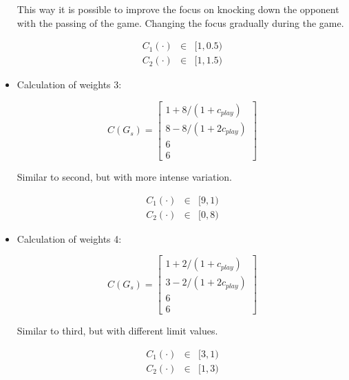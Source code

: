 \documentclass[a4paper]{article}
\begin{document}
\begin{itemize}
    \noindent This way it is possible to improve the focus on knocking down the opponent with the passing of the game. Changing the focus gradually during the game.
    
    \begin{eqnarray}
        C_1(\cdot) &\in& [1, 0.5) \\
        C_2(\cdot) &\in& [1, 1.5) 
    \end{eqnarray}
    
    \item Calculation of weights 3: 
    
    \begin{equation}
        C(G_s) =  \begin{bmatrix} 
        1+8/({1+c_{play}}) \\
        8-8/({1+2c_{play}}) \\ 
                                  6 \\ 6 \end{bmatrix}  \label{C3}
    \end{equation}
    
    \noindent Similar to second, but with more intense variation.
    
    \begin{eqnarray}
        C_1(\cdot) &\in& [9, 1) \\
        C_2(\cdot) &\in& [0, 8) 
    \end{eqnarray}
    
    \item Calculation of weights 4:
     
    \begin{equation}
        C(G_s) =  \begin{bmatrix} 
        1+2/({1+c_{play}}) \\
        3-2/({1+2c_{play}}) \\ 
                                  6 \\ 6 \end{bmatrix}  \label{C4}
    \end{equation}
    
    \noindent Similar to third, but with different limit values.
    
    \begin{eqnarray}
        C_1(\cdot) &\in& [3, 1) \\
        C_2(\cdot) &\in& [1, 3) 
    \end{eqnarray}
    
\end{itemize}
\end{document}
